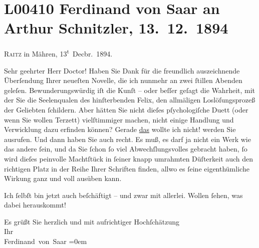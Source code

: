 

\section[Ferdinand von Saar an Arthur Schnitzler, 13. 12. 1894]{L00410 Ferdinand von Saar an Arthur Schnitzler, 13. 12. 1894}
\nopagebreak{}
\rehead{ }\normalsize\beginnumbering{}
\toendnotes[C]{\smallbreak\pagebreak[2]}
\toendnotes[C]{\smallbreak}
\pstart
           \raggedleft{}{\pb}\textsc{Raitz} in Mähren, 13\textsuperscript{t} Decbr. 1894.\pend
           
\pstart{}Sehr geehrter Herr Doctor!\pend\vspace{0.5em}
\pstart
           Haben Sie Dank für die freundlich auszeichnende Überſendung Ihrer neueſten Novelle, die ich nunmehr an zwei ſtillen Abenden
               geleſen. Bewunderungswürdig iſt die Kunſt – oder beſſer geſagt die Wahrheit, mit der
               Sie die Seelenqualen des hinſterbenden Felix, den allmäligen Loslöſungsprozeß der Geliebten
               ſchildern. Aber hätten Sie nicht dieſes pſychologiſche Duett (oder wenn Sie wollen
               Terzett) vielſtimmiger machen, nicht einige Handlung und Verwicklung dazu erfinden
               können? Gerade \uline{das} wollte ich nicht! werden Sie
               ausrufen. Und dann haben Sie auch recht. Es muß, es darf ja nicht ein Werk wie das
                  {\pb}andere ſein, und da Sie ſchon ſo viel
               Abwechſlungsvolles gebracht haben, ſo wird dieſes peinvolle Machtſtück in ſeiner
               knapp umrahmten Düſterkeit \introOben{}auch\introOben{} den richtigen Platz in der
               Reihe Ihrer Schriften finden, allwo es ſeine eigenthümliche Wirkung ganz und voll
               ausüben kann.\pend
           
\pstart
           Ich ſelbſt bin jetzt auch beſchäftigt – und zwar mit allerlei. Wollen ſehen, was
               dabei herauskommt!\pend
           
\pstart
           Es grüßt Sie herzlich und mit aufrichtiger Hochſchätzung{\\[\baselineskip]}Ihr{\\[\baselineskip]}\spacefill\mbox{Ferdinand von Saar}\pend
           \leftskip=0em{}\endnumbering{}  
      